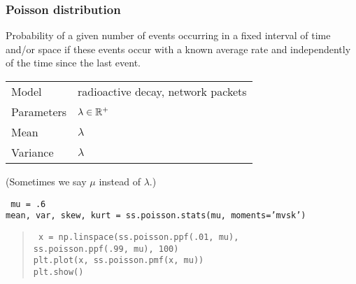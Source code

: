 \documentclass[t]{beamer}
\begin{document}
\begin{frame}
  \frametitle{Poisson distribution}

  Probability of a given number of events occurring in a fixed
  interval of time and/or space if these events occur with a known
  average rate and independently of the time since the last event.
  \bigskip
  
  \begin{tabular}{l|l}
    Model & radioactive decay, network packets\\[1mm]
    Parameters & $\lambda\in \mathbb{R}^+$\\[1mm]
    Mean & $\lambda$\\[1mm]
    Variance & $\lambda$
  \end{tabular}

  \vspace{6mm}
   { (Sometimes we say $\mu$ instead of $\lambda$.) }

   {
    \tt
    mu = .6\\
    mean, var, skew, kurt = ss.poisson.stats(mu, moments='mvsk')

  }
   {
    \begin{quote}
      \tt
      x = np.linspace(ss.poisson.ppf(.01, mu), \\
      \hspace{1cm} ss.poisson.ppf(.99, mu), 100) \\
      plt.plot(x, ss.poisson.pmf(x, mu)) \\
      plt.show()
    \end{quote}

    \note {  }
  }

  
  
\end{frame}
\end{document}
